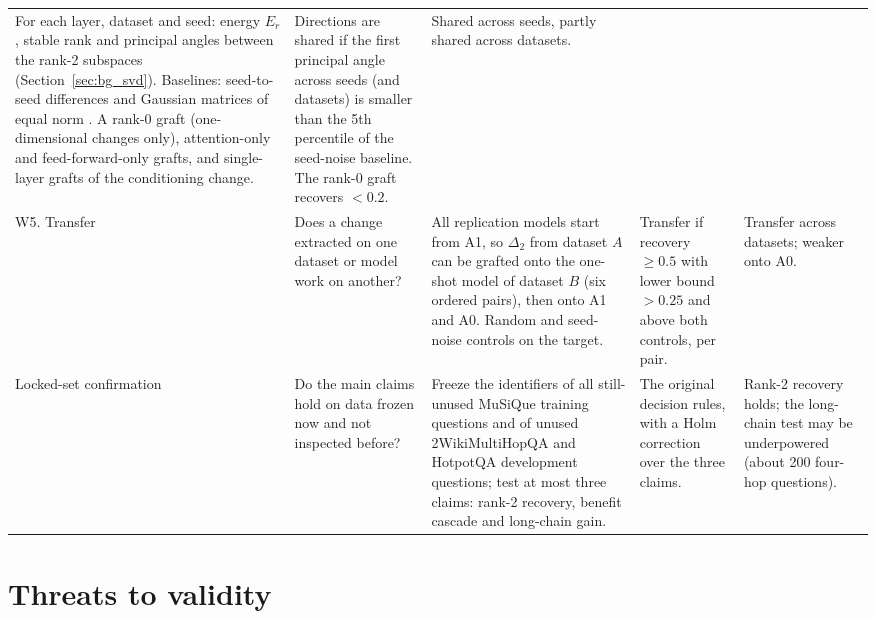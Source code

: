 \begin{table}[htbp]
\begin{tabularx}{\textwidth}{>{\raggedright\arraybackslash}p{1.5cm}>{\raggedright\arraybackslash}X>{\raggedright\arraybackslash}X>{\raggedright\arraybackslash}X>{\raggedright\arraybackslash}p{2.3cm}}
For each layer, dataset and seed: energy $E_r$, stable rank and principal angles between the rank-2 subspaces (Section~\ref{sec:bg_svd}). Baselines: seed-to-seed differences and Gaussian matrices of equal norm \cite{altaf2026noisebaseline}. A rank-0 graft (one-dimensional changes only), attention-only and feed-forward-only grafts, and single-layer grafts of the conditioning change. &
Directions are shared if the first principal angle across seeds (and datasets) is smaller than the 5th percentile of the seed-noise baseline. The rank-0 graft recovers $<0.2$. &
Shared across seeds, partly shared across datasets. \\
\addlinespace
W5. Transfer &
Does a change extracted on one dataset or model work on another? &
All replication models start from A1, so $\Delta_2$ from dataset $A$ can be grafted onto the one-shot model of dataset $B$ (six ordered pairs), then onto A1 and A0. Random and seed-noise controls on the target. &
Transfer if recovery $\ge 0.5$ with lower bound $>0.25$ and above both controls, per pair. &
Transfer across datasets; weaker onto A0. \\
\addlinespace
Locked-set confirmation &
Do the main claims hold on data frozen now and not inspected before? &
Freeze the identifiers of all still-unused MuSiQue training questions and of unused 2WikiMultiHopQA and HotpotQA development questions; test at most three claims: rank-2 recovery, benefit cascade and long-chain gain. &
The original decision rules, with a Holm correction over the three claims. &
Rank-2 recovery holds; the long-chain test may be underpowered (about 200 four-hop questions). \\
\bottomrule
\end{tabularx}
\end{table}

\section{Threats to validity}
\label{sec:threats}

